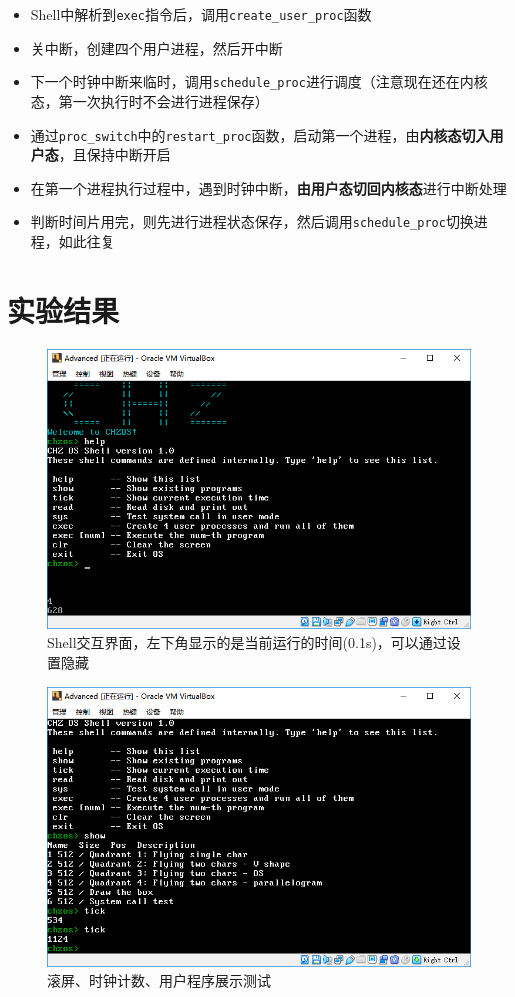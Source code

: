 \documentclass[logo,reportComp]{thesis}
\begin{document}
\begin{itemize}
	\item Shell中解析到\verb'exec'指令后，调用\verb'create_user_proc'函数
	\item 关中断，创建四个用户进程，然后开中断
	\item 下一个时钟中断来临时，调用\verb'schedule_proc'进行调度（注意现在还在内核态，第一次执行时不会进行进程保存）
	\item 通过\verb'proc_switch'中的\verb'restart_proc'函数，启动第一个进程，由\textbf{内核态切入用户态}，且保持中断开启
	\item 在第一个进程执行过程中，遇到时钟中断，\textbf{由用户态切回内核态}进行中断处理
	\item 判断时间片用完，则先进行进程状态保存，然后调用\verb'schedule_proc'切换进程，如此往复
\end{itemize}

\section{实验结果}
\begin{figure}[H]
\centering
\includegraphics[width=0.8\linewidth]{fig/help.PNG}
\caption{Shell交互界面，左下角显示的是当前运行的时间(0.1s)，可以通过设置隐藏}
\end{figure}

\begin{figure}[H]
\centering
\includegraphics[width=0.8\linewidth]{fig/show.PNG}
\caption{滚屏、时钟计数、用户程序展示测试}
\end{figure}
\end{document}

